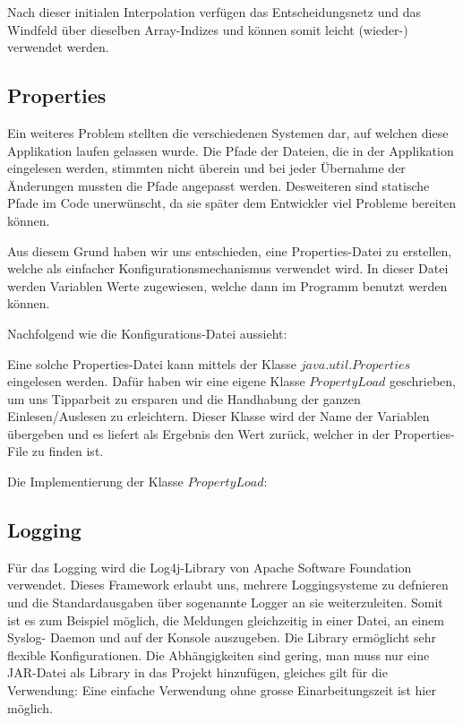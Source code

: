 Nach dieser initialen Interpolation verfügen das Entscheidungsnetz und das
Windfeld über dieselben Array-Indizes und können somit leicht (wieder-)
verwendet werden.

\subsection{Properties}
Ein weiteres Problem stellten die verschiedenen Systemen dar, auf welchen diese Applikation laufen gelassen wurde. Die Pfade der Dateien, die in der Applikation eingelesen werden, stimmten nicht überein und bei jeder Übernahme der Änderungen mussten die Pfade angepasst werden. Desweiteren sind statische Pfade im Code unerwünscht, da sie später dem Entwickler viel Probleme bereiten können. 

Aus diesem Grund haben wir uns entschieden, eine Properties-Datei zu erstellen, welche als einfacher Konfigurationsmechanismus verwendet wird. In dieser Datei werden Variablen Werte zugewiesen, welche dann im Programm benutzt werden können. 

Nachfolgend wie die Konfigurations-Datei aussieht:


Eine solche Properties-Datei kann mittels der Klasse $java.util.Properties$ eingelesen werden. Dafür haben wir eine eigene Klasse $PropertyLoad$ geschrieben, um uns Tipparbeit zu ersparen und die Handhabung der ganzen Einlesen/Auslesen zu erleichtern. Dieser Klasse wird der Name der Variablen übergeben und es liefert als Ergebnis den Wert zurück, welcher in der Properties-File zu finden ist.

Die Implementierung der Klasse $PropertyLoad$:


\subsection{Logging}
Für das Logging wird die Log4j-Library von Apache Software Foundation verwendet. Dieses Framework
erlaubt uns, mehrere Loggingsysteme zu defnieren und die Standardausgaben über sogenannte Logger an sie
weiterzuleiten. Somit ist es zum Beispiel möglich, die Meldungen gleichzeitig in einer Datei, an einem Syslog-
Daemon und auf der Konsole auszugeben. Die Library ermöglicht sehr flexible Konfigurationen. Die Abhängigkeiten sind gering, man muss nur eine JAR-Datei als Library in das Projekt hinzufügen, gleiches gilt für die Verwendung: Eine einfache Verwendung ohne grosse Einarbeitungszeit ist hier möglich.

